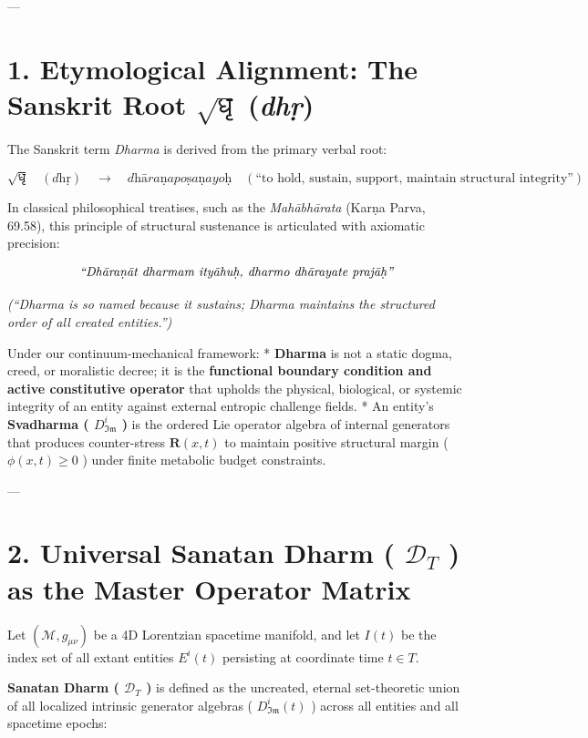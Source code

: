 \documentclass[11pt,a4paper]{article}
\theoremstyle{definition}
\theoremstyle{remark}
\begin{document}
---

\section{1. Etymological Alignment: The Sanskrit Root $\sqrt{\text{धृ}}$ (\textit{dhṛ})}

The Sanskrit term \textit{Dharma} is derived from the primary verbal root:


\begin{equation}
\sqrt{\text{धृ}} \quad (\textit{dhṛ}) \quad \longrightarrow \quad \textit{dhāraṇapoṣaṇayoḥ} \quad (\text{“to hold, sustain, support, maintain structural integrity”})
\end{equation}


In classical philosophical treatises, such as the \textit{Mahābhārata} (Karṇa Parva, 69.58), this principle of structural sustenance is articulated with axiomatic precision:


\begin{equation}
\text{\textit{“Dhāraṇāt dharmam ityāhuḥ, dharmo dhārayate prajāḥ”}}
\end{equation}


\textit{(“Dharma is so named because it sustains; Dharma maintains the structured order of all created entities.”)}

Under our continuum-mechanical framework:
* \textbf{Dharma} is not a static dogma, creed, or moralistic decree; it is the \textbf{functional boundary condition and active constitutive operator} that upholds the physical, biological, or systemic integrity of an entity against external entropic challenge fields.
* An entity's \textbf{Svadharma ( $D_{\mathfrak{Im}}^i$ )} is the ordered Lie operator algebra of internal generators that produces counter-stress $\mathbf{R}(x, t)$ to maintain positive structural margin ( $\phi(x, t) \ge 0$ ) under finite metabolic budget constraints.

---

\section{2. Universal Sanatan Dharm ( $\mathcal{D}_T$ ) as the Master Operator Matrix}

Let $(\mathcal{M}, g_{\mu\nu})$ be a 4D Lorentzian spacetime manifold, and let $I(t)$ be the index set of all extant entities $E^i(t)$ persisting at coordinate time $t \in T$.

\textbf{Sanatan Dharm ( $\mathcal{D}_T$ )} is defined as the uncreated, eternal set-theoretic union of all localized intrinsic generator algebras ( $D_{\mathfrak{Im}}^i(t)$ ) across all entities and all spacetime epochs:
\end{document}

